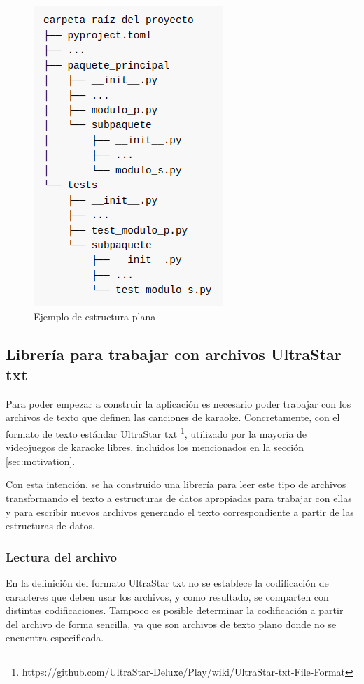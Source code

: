 \begin{figure}[h]
	\centering
	\includegraphics[width=0.5\linewidth]{logos/layout.png}
	\caption{Ejemplo de estructura plana}
	\label{fig:layout1}
\end{figure}


\subsection{Librería para trabajar con archivos UltraStar txt}

Para poder empezar a construir la aplicación es necesario poder trabajar con los archivos de texto que definen las canciones de karaoke. Concretamente, con el formato de texto estándar UltraStar txt \footnote{https://github.com/UltraStar-Deluxe/Play/wiki/UltraStar-txt-File-Format},  utilizado por la mayoría de videojuegos de karaoke libres, incluidos los mencionados en la sección \ref{sec:motivation}.

Con esta intención, se ha construido una librería para leer este tipo de archivos transformando el texto a estructuras de datos apropiadas para trabajar con ellas y para escribir nuevos archivos generando el texto correspondiente a partir de las estructuras de datos.

\subsubsection{Lectura del archivo}

En la definición del formato UltraStar txt no se establece la codificación de caracteres que deben usar los archivos, y como resultado, se comparten con distintas codificaciones. Tampoco es posible determinar la codificación a partir del archivo de forma sencilla, ya que son archivos de texto plano donde no se encuentra especificada.

